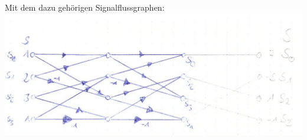 	\\
		Mit dem dazu gehörigen Signalflussgraphen:\\
		\includegraphics[width = \textwidth]{A42_Signalflussgraph.png}
\newpage